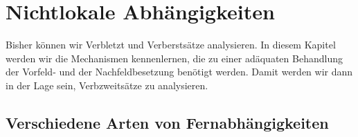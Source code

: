
\chapter{Nichtlokale Abhängigkeiten}
\label{chap-nla}

Bisher können wir Verbletzt und Verberstsätze analysieren. In diesem Kapitel werden wir
die Mechanismen kennenlernen, die zu einer adäquaten Behandlung der Vorfeld- und
der Nachfeldbesetzung benötigt werden. Damit werden wir dann in der Lage sein, Verbzweitsätze
zu analysieren.

\section{Verschiedene Arten von Fernabhängigkeiten}

